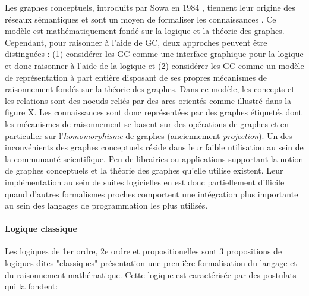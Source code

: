 Les graphes conceptuels, introduits par Sowa en 1984 \cite{sowa1983conceptual}, tiennent leur origine des réseaux sémantiques \cite{lehmann1992semantic} et sont un moyen de formaliser les connaissances \cite{chein2008graph}. Ce modèle est mathématiquement fondé sur la logique et la théorie des graphes. Cependant, pour raisonner à l'aide de GC, deux approches peuvent être distinguées : (1) considérer les GC comme une interface graphique pour la logique et donc raisonner à l’aide de la logique et (2) considérer les GC comme un modèle de représentation à part entière disposant de ses propres mécanismes de raisonnement fondés sur la théorie des graphes. Dans ce modèle, les concepts et les relations sont des noeuds reliés par des arcs orientés comme illustré dans la figure X. Les connaissances sont donc représentées par des graphes étiquetés dont les mécanismes de raisonnement se basent sur des opérations de graphes et en particulier sur l'\textit{homomorphisme} de graphes (anciennement \textit{projection}).
Un des inconvénients des graphes conceptuels réside dans leur faible utilisation au sein de la communauté scientifique. Peu de librairies ou applications supportant la notion de graphes conceptuels et la théorie des graphes qu'elle utilise existent. Leur implémentation au sein de suites logicielles en est donc partiellement difficile quand d'autres formalismes proches comportent une intégration plus importante au sein des langages de programmation les plus utilisés.

\paragraph{Logique classique}

Les logiques de 1er ordre, 2e ordre et propositionelles sont 3 propositions de logiques dites "classiques" présentation une première formalisation du langage et du raisonnement mathématique. Cette logique est caractérisée par des postulats qui la fondent:


